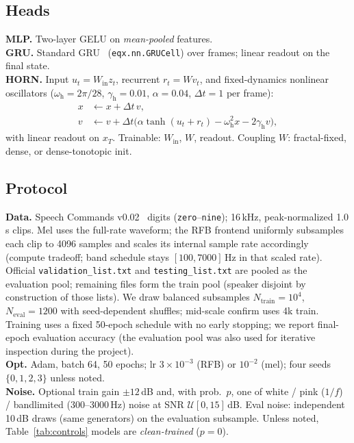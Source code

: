 \documentclass[11pt,a4paper]{article}
\begin{document}
\subsection{Heads}
\textbf{MLP.} Two-layer GELU on \emph{mean-pooled} features.\\
\textbf{GRU.} Standard GRU~\citep{cho2014gru} (\texttt{eqx.nn.GRUCell}) over
frames; linear readout on the final state.\\
\textbf{HORN.} Input $u_t=W_{\mathrm{in}}z_t$, recurrent $r_t=W v_t$, and
fixed-dynamics nonlinear oscillators ($\omega_{\mathrm{h}}{=}2\pi/28$,
$\gamma_{\mathrm{h}}{=}0.01$, $\alpha{=}0.04$, $\Delta t{=}1$ per frame):
\begin{align}
  x &\leftarrow x + \Delta t\, v,\\
  v &\leftarrow v + \Delta t\bigl(\alpha\tanh(u_t+r_t)
       -\omega_{\mathrm{h}}^2 x - 2\gamma_{\mathrm{h}} v\bigr),
\end{align}
with linear readout on $x_T$. Trainable: $W_{\mathrm{in}}$, $W$, readout.
Coupling $W$: fractal-fixed, dense, or dense-tonotopic init.

\subsection{Protocol}
\textbf{Data.} Speech Commands v0.02~\citep{warden2018speechcommands} digits
(\texttt{zero}--\texttt{nine}); 16\,kHz, peak-normalized 1.0\,s clips.
Mel uses the full-rate waveform; the RFB frontend uniformly subsamples each
clip to 4096 samples and scales its internal sample rate accordingly (compute
tradeoff; band schedule stays $[100,7000]$\,Hz in that scaled rate).
Official \texttt{validation\_list.txt} and \texttt{testing\_list.txt} are
pooled as the evaluation pool; remaining files form the train pool (speaker
disjoint by construction of those lists). We draw balanced subsamples
$N_{\mathrm{train}}{=}10^4$, $N_{\mathrm{eval}}{=}1200$ with seed-dependent
shuffles; mid-scale confirm uses 4k train. Training uses a fixed 50-epoch
schedule with no early stopping; we report final-epoch evaluation accuracy
(the evaluation pool was also used for iterative inspection during the project).\\
\textbf{Opt.} Adam, batch 64, 50 epochs; lr $3{\times}10^{-3}$ (RFB) or
$10^{-2}$ (mel); four seeds $\{0,1,2,3\}$ unless noted.\\
\textbf{Noise.} Optional train gain $\pm 12$\,dB and, with prob.\ $p$, one of
white / pink ($1/f$) / bandlimited (300--3000\,Hz) noise at
SNR $\mathcal{U}[0,15]$\,dB. Eval noise: independent 10\,dB draws
(same generators) on the evaluation subsample. Unless noted, Table~\ref{tab:controls}
models are \emph{clean-trained} ($p{=}0$).
\end{document}
